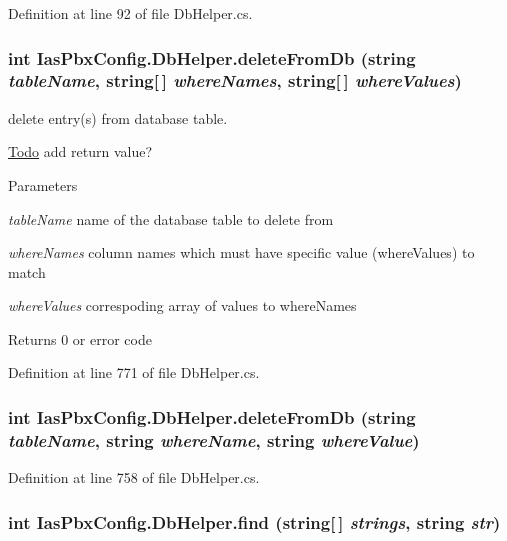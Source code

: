 Definition at line 92 of file DbHelper.cs.\hypertarget{class_ias_pbx_config_1_1_db_helper_a0b0e09192378e91c00084b10b52bff0a}{
\subsubsection[{deleteFromDb}]{\setlength{\rightskip}{0pt plus 5cm}int IasPbxConfig.DbHelper.deleteFromDb (string {\em tableName}, \/  string\mbox{[}$\,$\mbox{]} {\em whereNames}, \/  string\mbox{[}$\,$\mbox{]} {\em whereValues})}}
\label{class_ias_pbx_config_1_1_db_helper_a0b0e09192378e91c00084b10b52bff0a}


delete entry(s) from database table. \begin{Desc}
\item[\hyperlink{todo__todo000021}{Todo}]add return value? \end{Desc}

\begin{DoxyParams}{Parameters}
\item[{\em tableName}]name of the database table to delete from \item[{\em whereNames}]column names which must have specific value (whereValues) to match \item[{\em whereValues}]correspoding array of values to whereNames \end{DoxyParams}
\begin{DoxyReturn}{Returns}
0 or error code 
\end{DoxyReturn}


Definition at line 771 of file DbHelper.cs.\hypertarget{class_ias_pbx_config_1_1_db_helper_ad5986e97e1ec60f2e9ad2b83429d7d11}{
\subsubsection[{deleteFromDb}]{\setlength{\rightskip}{0pt plus 5cm}int IasPbxConfig.DbHelper.deleteFromDb (string {\em tableName}, \/  string {\em whereName}, \/  string {\em whereValue})}}
\label{class_ias_pbx_config_1_1_db_helper_ad5986e97e1ec60f2e9ad2b83429d7d11}


Definition at line 758 of file DbHelper.cs.\hypertarget{class_ias_pbx_config_1_1_db_helper_a92c16852946e46462fe8bb9923ce374c}{
\subsubsection[{find}]{\setlength{\rightskip}{0pt plus 5cm}int IasPbxConfig.DbHelper.find (string\mbox{[}$\,$\mbox{]} {\em strings}, \/  string {\em str})}}
\label{class_ias_pbx_config_1_1_db_helper_a92c16852946e46462fe8bb9923ce374c}


